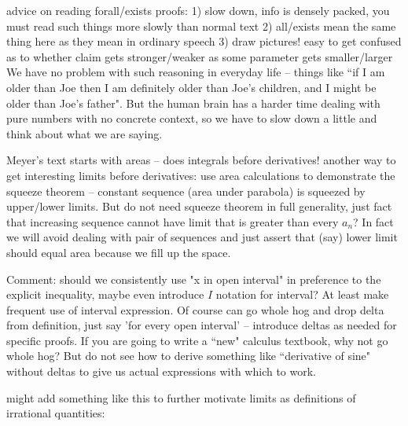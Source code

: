 advice on reading forall/exists proofs: 1) slow down, info is densely packed, you must read such
things more slowly than normal text 2) all/exists mean the same thing here as they mean in ordinary speech 3) draw pictures! easy to get confused as to whether claim gets stronger/weaker as some parameter gets smaller/larger
We have no problem with such reasoning in everyday life -- things like ``if I am older than Joe  then I am definitely older than Joe's children, and I might be older than Joe's father". But the human brain has a harder time dealing with pure numbers with no concrete context, so we have to slow down a little and think about what we are saying.

Meyer's text starts with areas -- does integrals before derivatives! 
another way to get interesting limits before derivatives: use area calculations to demonstrate the squeeze theorem -- constant sequence (area under parabola) is squeezed by upper/lower limits. But do not need squeeze theorem in full generality, just fact that increasing sequence cannot have limit that is greater than every $a_n$? In fact we will avoid dealing with pair of sequences and just assert that (say) lower limit should equal area because we fill up the space.

Comment: should we consistently use "x in open interval" in preference to the explicit inequality, maybe even introduce $I$ notation for interval? At least make frequent use of interval expression. Of course can go whole hog and drop delta from definition, just say 'for every open interval' -- introduce deltas as needed for specific proofs. If you are going to write a ``new" calculus textbook, why not go whole hog? But do not see how to derive something like ``derivative of sine" without deltas to give us actual expressions with which to work.


might add something like this to further motivate limits as definitions of irrational quantities:

